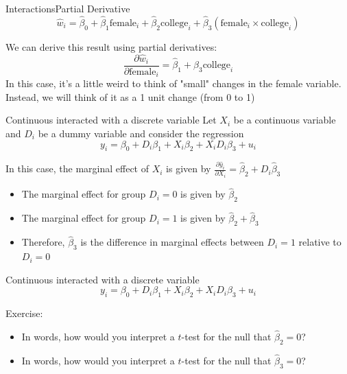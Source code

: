 \documentclass[aspectratio=169,t,11pt,table]{beamer}
\begin{document}
\begin{frame}{Interactions}{Partial Derivative}
  \vspace{-\bigskipamount}
  $$
    \hat{w}_i = \hat{\beta}_0 + \hat{\beta}_1 \text{female}_i + \hat{\beta}_2 \text{college}_i + \hat{\beta}_3 (\text{female}_i \times \text{college}_i) 
  $$
  
  \bigskip
  We can derive this result using partial derivatives:
  $$
    \frac{\partial \hat{w}_i}{\partial \text{female}_i} = 
    \hat{\beta}_1 + \hat{\beta}_3 \text{college}_i
  $$
  \pause
  In this case, it's a little weird to think of "small" changes in the female variable. Instead, we will think of it as a 1 unit change (from 0 to 1)
\end{frame}

\begin{frame}{Continuous interacted with a discrete variable}
  Let $X_i$ be a continuous variable and $D_i$ be a dummy variable and consider the regression
  $$
    y_i = \beta_0 + D_i \beta_1 + X_i \beta_2 + X_i D_i \beta_3 + u_i
  $$
  
  \pause
  \bigskip
  In this case, the marginal effect of $X_i$ is given by 
  $\frac{\partial \hat{y}_i}{\partial X_i} = \hat{\beta}_2 + D_i \hat{\beta}_3$ 
  \begin{itemize}
    \item The marginal effect for group $D_i = 0$ is given by $\hat{\beta}_2$
    \item The marginal effect for group $D_i = 1$ is given by $\hat{\beta}_2 + \hat{\beta}_3$
    
    \pause
    \item Therefore, $\hat{\beta}_3$ is the difference in marginal effects between $D_i = 1$ relative to $D_i = 0$
  \end{itemize}
\end{frame}


\begin{frame}{Continuous interacted with a discrete variable}
  \vspace*{-\bigskipamount}
  $$
    y_i = \beta_0 + D_i \beta_1 + X_i \beta_2 + X_i D_i \beta_3 + u_i
  $$
  
  \bigskip
  Exercise: 
  \begin{itemize}
    \item In words, how would you interpret a $t$-test for the null that $\hat{\beta}_2 = 0$?
    
    \item In words, how would you interpret a $t$-test for the null that $\hat{\beta}_3 = 0$?
  \end{itemize}
\end{frame}
\end{document}
